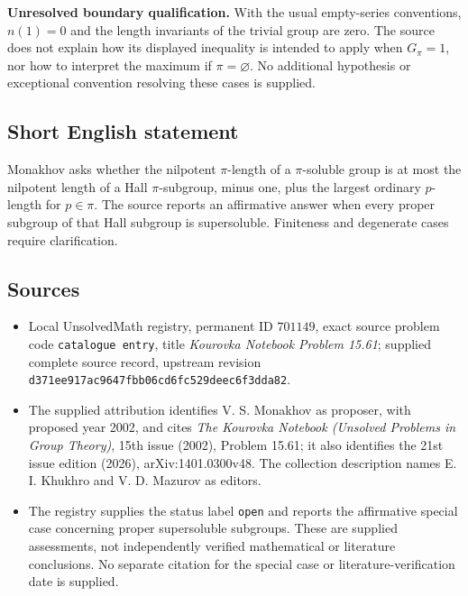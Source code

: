 \documentclass[11pt]{article}
\begin{document}
\textbf{Unresolved boundary qualification.} With the usual empty-series conventions, \(n(1)=0\) and the length invariants of the trivial group are zero. The source does not explain how its displayed inequality is intended to apply when \(G_\pi=1\), nor how to interpret the maximum if \(\pi=\varnothing\). No additional hypothesis or exceptional convention resolving these cases is supplied.
\subsection{Short English statement}
Monakhov asks whether the nilpotent \(\pi\)-length of a \(\pi\)-soluble group is at most the nilpotent length of a Hall \(\pi\)-subgroup, minus one, plus the largest ordinary \(p\)-length for \(p\in\pi\). The source reports an affirmative answer when every proper subgroup of that Hall subgroup is supersoluble. Finiteness and degenerate cases require clarification.
\subsection{Sources}
\begin{itemize}
\item Local UnsolvedMath registry, permanent ID \(701149\), exact source problem code \texttt{catalogue entry}, title \emph{Kourovka Notebook Problem 15.61}; supplied complete source record, upstream revision \texttt{d371ee917ac9647fbb06cd6fc529deec6f3dda82}.
\item The supplied attribution identifies V. S. Monakhov as proposer, with proposed year 2002, and cites \emph{The Kourovka Notebook (Unsolved Problems in Group Theory)}, 15th issue (2002), Problem 15.61; it also identifies the 21st issue edition (2026), arXiv:1401.0300v48. The collection description names E. I. Khukhro and V. D. Mazurov as editors.
\item The registry supplies the status label \texttt{open} and reports the affirmative special case concerning proper supersoluble subgroups. These are supplied assessments, not independently verified mathematical or literature conclusions. No separate citation for the special case or literature-verification date is supplied.
\end{itemize}
\end{document}
